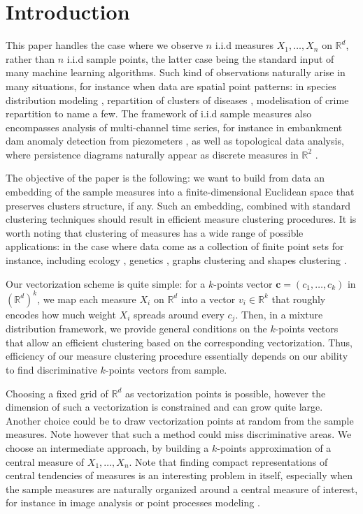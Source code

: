 \documentclass[noinfoline,preprint]{article}
\newcommand{\cb}{\mathbf{c}}
\newcommand{\R}{\mathbb{R}}
\renewcommand{\1}{\mathds 1}
\begin{document}
\section{Introduction}
This paper handles the case where we observe $n$ i.i.d measures $X_1, \hdots, X_n$ on $\R^d$, rather than $n$ i.i.d sample points, the latter case being the standard input of many machine learning algorithms. Such kind of observations naturally arise in many situations, for instance when data are spatial point patterns: in species distribution modeling \cite{Renner15}, repartition of clusters of diseases \cite{Diggle90}, modelisation of crime repartition \cite{Shirota17} to name a few. The framework of i.i.d sample measures also encompasses analysis of multi-channel time series, for instance in embankment dam anomaly detection from piezometers \cite{Jung15}, as well as topological data analysis,  where persistence diagrams naturally appear as discrete measures in $\R^2$ \cite{Chazal09,Chazal2016}. 

The objective of the paper is the following: we want to build from data an embedding of the sample measures into a finite-dimensional Euclidean space that preserves clusters structure, if any. Such an embedding, combined with standard clustering techniques should result in efficient measure clustering procedures. It is worth noting that clustering of measures has a wide range of possible applications: in the case where data come as a collection of finite point sets for instance, including ecology \cite{Renner15}, genetics \cite{Royer19,Adams17}, graphs clustering \cite{Carriere19,Tran18} and shapes clustering \cite{Chazal09}.

Our vectorization scheme is quite simple: for a $k$-points vector $\cb=(c_1, \hdots, c_k)$ in $(\R^d)^k$, we map each measure $X_i$ on $\R^d$ into a vector $v_i \in \R^k$ that roughly encodes how much weight $X_i$ spreads around every $c_j$. Then, in a mixture distribution framework, we provide general conditions on the $k$-points vectors that allow an efficient clustering based on the corresponding vectorization. Thus, efficiency of our measure clustering procedure essentially depends    on our ability to find discriminative $k$-points vectors from sample.

Choosing a fixed grid of $\R^d$ as vectorization points is possible, however the dimension of such a vectorization is constrained and can grow quite large. Another choice could be to draw vectorization points at random from the sample measures. Note however that such a method could miss discriminative areas. We choose an intermediate approach, by building a $k$-points approximation of a central measure of $X_1, \hdots, X_n$. Note that finding compact representations of central tendencies of measures is an interesting problem in itself, especially  when the sample measures are naturally organized around a central measure of interest, for instance in image analysis \cite{Cuturi13} or point processes modeling \cite{Renner15,Diggle90,Shirota17}. 
\end{document}
